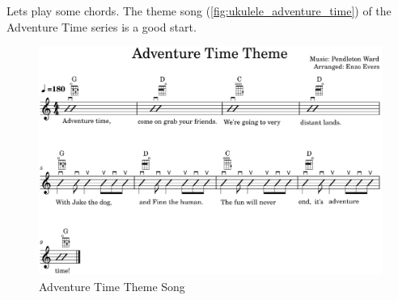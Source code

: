 \clearpage

Lets play some chords. The theme song (\autoref{fig:ukulele_adventure_time}) of the Adventure Time series is a good start.

\begin{figure}[h]
	\centering
	\includegraphics[width=\textwidth]{../../MuseScore/Ukulele/UkuleleAdventureTimeTheme.png}
	\caption{Adventure Time Theme Song}
	\label{fig:ukulele_adventure_time}
\end{figure}